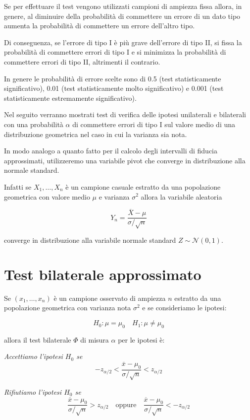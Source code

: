 \documentclass[]{book}
\begin{document}
Se per effettuare il test vengono utilizzati campioni di ampiezza fissa
allora, in genere, al diminuire della probabilità di commettere un
errore di un dato tipo aumenta la probabilità di commettere un errore
dell'altro tipo.

Di conseguenza, se l'errore di tipo I è più grave dell'errore di tipo
II, si fissa la probabilità di commettere errori di tipo I e si
minimizza la probabilità di commettere errori di tipo II, altrimenti il
contrario.

In genere le probabilità di errore scelte sono di 0.5 (test
statisticamente significativo), 0.01 (test statisticamente molto
significativo) e 0.001 (test statisticamente estremamente
significativo).

Nel seguito verranno mostrati test di verifica delle ipotesi unilaterali
e bilaterali con una probabilità \(\alpha\) di commettere errori di tipo
I sul valore medio di una distribuzione geometrica nel caso in cui la
varianza sia nota.

In modo analogo a quanto fatto per il calcolo degli intervalli di
fiducia approssimati, utilizzeremo una variabile pivot che converge in
distribuzione alla normale standard.

Infatti se \(X_1,\dots,X_n\) è un campione casuale estratto da una
popolazione geometrica con valore medio \(\mu\) e varianza \(\sigma^2\)
allora la variabile aleatoria

\[Y_n = \frac{\overline X - \mu}{\sigma / \sqrt{n}} \]

converge in distribuzione alla variabile normale standard
\(Z \sim \mathcal{N}(0, 1)\).

\section{Test bilaterale
approssimato}\label{test-bilaterale-approssimato}

Se \((x_1,\dots,x_n)\) è un campione osservato di ampiezza \(n\)
estratto da una popolazione geometrica con varianza nota \(\sigma^2\) e
se consideriamo le ipotesi:

\[H_0 : \mu = \mu_0 \quad H_1 : \mu \neq \mu_0\]

allora il test bilaterale \(\Phi\) di misura \(\alpha\) per le ipotesi
è:

\emph{Accettiamo l'ipotesi \(H_0\) se}
\[-z_{\alpha/2} < \frac{\overline x - \mu_0}{\sigma / \sqrt{n}} < z_{\alpha/2}\]

\emph{Rifiutiamo l'ipotesi \(H_0\) se}
\[\frac{\overline x - \mu_0}{\sigma / \sqrt{n}} > z_{\alpha/2} \quad \text{oppure} \quad \frac{\overline x - \mu_0}{\sigma /  \sqrt{n}} < - z_{\alpha/2} \]
\end{document}
